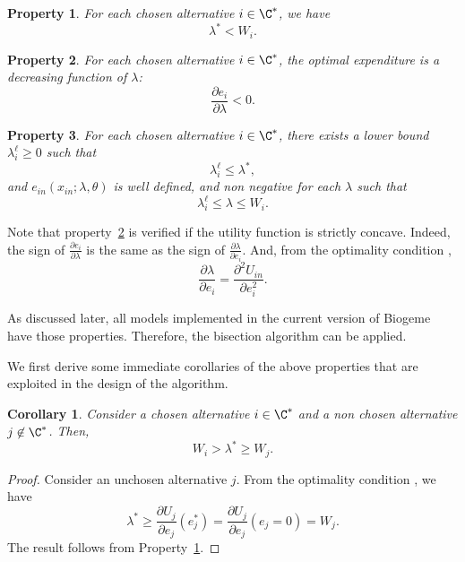 \documentclass[12pt,a4paper]{article}
\newtheorem{property}{Property}
\newtheorem{corollary}{Corollary}
\begin{document}
\begin{property}
    \label{prop:one}
    For each chosen alternative $i \in \C^*$, we have
    \[
        \lambda^* < W_i.
    \]
\end{property}
\begin{property}
    \label{prop:two}
    For each chosen alternative $i\in\C^*$, the optimal expenditure  is a decreasing function of $\lambda$:
    \[
        \frac{\partial e_i}{\partial \lambda} < 0.
    \]
    \end{property}
\begin{property}
    \label{prop:three}
    For each chosen alternative $i\in\C^*$, there exists  a lower bound $\lambda^\ell_i \geq 0$ such that
    \[
            \lambda^\ell_i \leq \lambda^*,
    \]
    and $e_{in}(x_{in}; \lambda, \theta)$ is well defined, and non negative for each $\lambda$ such that
    \[
        \lambda^\ell_i \leq \lambda \leq W_i.
    \]
\end{property}

Note that property~\ref{prop:two} is verified if the utility function is strictly concave. Indeed, the sign of $\frac{\partial e_i}{\partial \lambda}$ is the same as the sign
of $\frac{\partial \lambda}{\partial e_i}$. And, from the optimality condition ,
\[
    \frac{\partial \lambda}{\partial e_i} = \frac{\partial^2 U_{in}}{\partial e_i^2}.
\]

As discussed later, all models implemented in the current version of Biogeme have those properties. Therefore, the
bisection algorithm can be applied.

We first derive some immediate corollaries of the above properties that are exploited in the design of the algorithm.

\begin{corollary}
    \label{cor:bounds_lambda}
    Consider a chosen alternative $i \in  \C^*$ and a non chosen alternative $j \not\in\C^*$. Then,
    \begin{equation}
        \label{eq:bounds_lambda}
        W_i > \lambda^* \geq W_j.
    \end{equation}
\end{corollary}
\begin{proof}
   Consider an unchosen alternative $j$. From the optimality condition , we have
    \[
        \lambda^* \geq \frac{\partial U_j}{\partial e_j}(e^*_j) = \frac{\partial U_j}{\partial e_j}(e_j=0) = W_j.
    \]
    The result follows from Property~\ref{prop:one}.
\end{proof}
\end{document}
